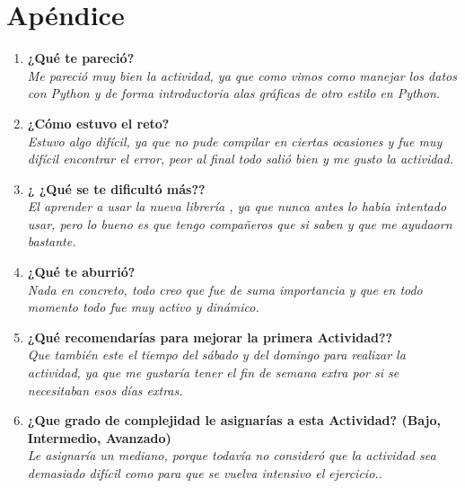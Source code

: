\documentclass[12pt]{article}
\begin{document}
\section{Apéndice}
\begin{enumerate}
\item \textbf{¿Qué te pareció?}\\
\textit{Me pareció muy bien la actividad, ya que como vimos como manejar los datos con Python y de forma introductoria alas gráficas de otro estilo en Python.}

\item \textbf{¿Cómo estuvo el reto?}\\
\textit{Estuvo algo difícil, ya que no pude compilar en ciertas ocasiones y fue muy difícil encontrar el error, peor al final todo salió bien y me gusto la actividad.}

\item \textbf{¿ ¿Qué se te dificultó más??} \\
\textit{El aprender a usar la nueva librería , ya que nunca antes lo habia intentado usar, pero lo bueno es que tengo compañeros que si saben y que me ayudaorn bastante.}

\item \textbf{¿Qué te aburrió?}\\
\textit{Nada en concreto, todo creo que fue de suma importancia y que en todo momento todo fue muy activo y dinámico.}

\item \textbf{¿Qué recomendarías para mejorar la primera Actividad?? }\\
\textit{Que también este el tiempo del sábado y del domingo para realizar la actividad, ya que me gustaría tener el fin de semana extra por si se necesitaban esos días extras.}

\item \textbf{¿Que grado de complejidad le asignarías a esta Actividad? (Bajo, Intermedio, Avanzado)} \\
\textit{Le asignaría un mediano, porque todavía no consideró que la actividad sea demasiado difícil como para que se vuelva intensivo el ejercicio..}

\end{enumerate}
\end{document}
